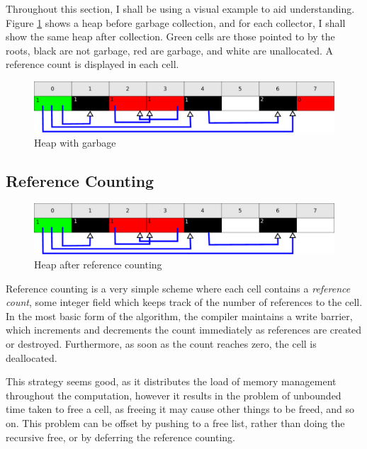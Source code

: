 Throughout this section, I shall be using a visual example to aid
understanding. Figure \ref{fig:lit-gc-before} shows a heap before
garbage collection, and for each collector, I shall show the same heap
after collection. Green cells are those pointed to by the roots, black
are not garbage, red are garbage, and white are unallocated. A
reference count is displayed in each cell.

\begin{figure}[h]
  \centering
  \includegraphics[width=\textwidth]{lit-gc-before}
  \caption{Heap with garbage}
  \label{fig:lit-gc-before}
\end{figure}

\subsection{Reference Counting}
\label{sec:lit-gc-refcount}

\begin{figure}[h]
  \centering
  \includegraphics[width=\textwidth]{lit-gc-refcount}
  \caption{Heap after reference counting}
  \label{fig:lit-gc-refcount}
\end{figure}

Reference counting is a very simple scheme where each cell contains a
\textit{reference count}, some integer field which keeps track of the
number of references to the cell. In the most basic form of the
algorithm, the compiler maintains a write barrier, which increments
and decrements the count immediately as references are created or
destroyed. Furthermore, as soon as the count reaches zero, the cell is
deallocated\cite{Collins60}.

This strategy seems good, as it distributes the load of memory
management throughout the computation, however it results in the
problem of unbounded time taken to free a cell, as freeing it may
cause other things to be freed, and so on\cite{GarbageCollection}.
This problem can be offset by pushing to a free list, rather than
doing the recursive free, or by deferring the reference counting.


